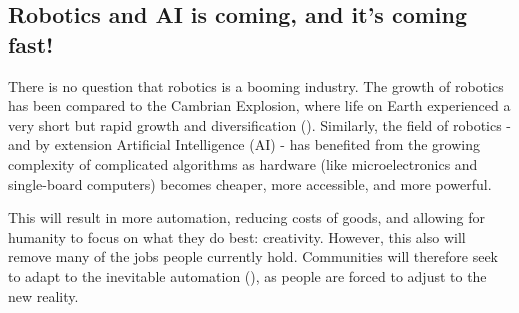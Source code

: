 \subsection{Robotics and AI is coming, and it's coming fast!}
There is no question that robotics is a booming industry.  The growth of robotics has been compared to the Cambrian Explosion, where life on Earth experienced a very short but rapid growth and diversification (\cite{Cambrian}). Similarly, the field of robotics - and by extension Artificial Intelligence (AI) - has benefited from the growing complexity of complicated algorithms as hardware (like microelectronics and single-board computers) becomes cheaper, more accessible, and more powerful. 

This will result in more automation, reducing costs of goods, and allowing for humanity to focus on what they do best: creativity. However, this also will remove many of the jobs people currently hold. Communities will therefore seek to adapt to the inevitable automation (\cite{UnionsAutomation}), as people are forced to adjust to the new reality.